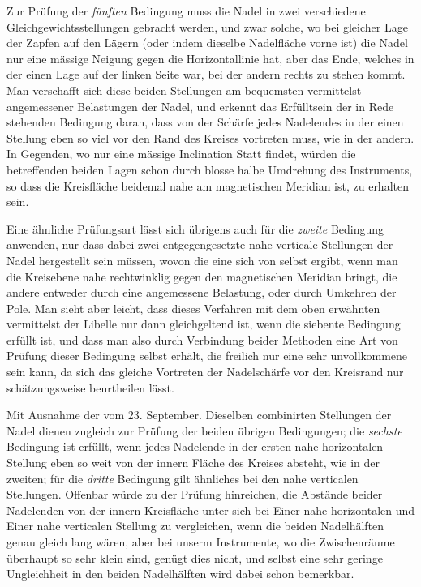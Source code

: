 Zur Prüfung der \textit{fünften} Bedingung muss die Nadel in zwei verschiedene Gleichgewichtsstellungen gebracht werden, und zwar solche, wo bei gleicher Lage der Zapfen auf den Lägern (oder indem dieselbe Nadelfläche vorne ist) die Nadel nur eine mässige Neigung gegen die Horizontallinie hat, aber das Ende, welches in der einen Lage auf der linken Seite war, bei der andern rechts zu stehen kommt. Man verschafft sich diese beiden Stellungen am bequemsten vermittelst angemessener Belastungen der Nadel, und erkennt das Erfülltsein der in Rede stehenden Bedingung daran, dass von der Schärfe jedes Nadelendes in der einen Stellung eben so viel vor den Rand des Kreises vortreten muss, wie in der andern. In Gegenden, wo nur eine mässige Inclination Statt findet, würden die betreffenden beiden Lagen schon durch blosse halbe Umdrehung des Instruments, so dass die Kreisfläche beidemal nahe am magnetischen Meridian ist, zu erhalten sein.

Eine ähnliche Prüfungsart lässt sich übrigens auch für die \textit{zweite} Bedingung anwenden, nur dass dabei zwei entgegengesetzte nahe verticale Stellungen der Nadel hergestellt sein müssen, wovon die eine sich von selbst ergibt, wenn man die Kreisebene nahe rechtwinklig gegen den magnetischen Meridian bringt, die andere entweder durch eine angemessene Belastung, oder durch Umkehren der Pole. Man sieht aber leicht, dass dieses Verfahren mit dem oben erwähnten vermittelst der Libelle nur dann gleichgeltend ist, wenn die siebente Bedingung erfüllt ist, und dass man also durch Verbindung beider Methoden eine Art von Prüfung dieser Bedingung selbst erhält, die freilich nur eine sehr unvollkommene sein kann, da sich das gleiche Vortreten der Nadelschärfe vor den Kreisrand nur schätzungsweise beurtheilen lässt.

\expandafter\def\csname HistoricalNoteText454\endcsname{Mit Ausnahme der vom 23. September.}%
Dieselben combinirten Stellungen der Nadel dienen zugleich zur Prüfung der beiden übrigen Bedingungen; die \textit{sechste} Bedingung ist erfüllt, wenn jedes Nadelende in der ersten nahe horizontalen Stellung eben so weit von der innern Fläche des Kreises absteht, wie in der zweiten; für die \textit{dritte} Bedingung gilt ähnliches bei den nahe verticalen Stellungen. Offenbar würde zu der Prüfung hinreichen, die Abstände beider Nadelenden von der innern Kreisfläche unter sich bei Einer nahe horizontalen und Einer nahe verticalen Stellung zu vergleichen, wenn die beiden Nadelhälften genau gleich lang wären, aber bei unserm Instrumente, wo die Zwischenräume überhaupt so sehr klein sind, genügt dies nicht, und selbst eine sehr geringe Ungleichheit in den beiden Nadelhälften wird dabei schon bemerkbar.

